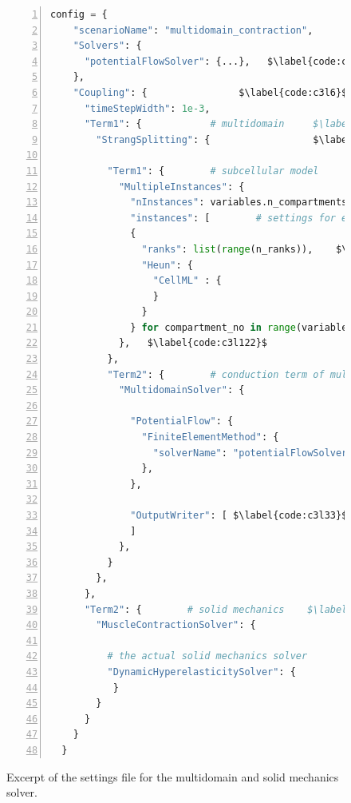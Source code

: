 \begin{figure}
\centering
\begin{framed}
\begin{lstlisting}[basicstyle=\scriptsize\ttfamily,language=Python,commentstyle=\color{gray},numbers=left]
  config = {
    "scenarioName": "multidomain_contraction",
    "Solvers": {
      "potentialFlowSolver": {...},   $\label{code:c3l4}$
    },
    "Coupling": {                $\label{code:c3l6}$
      "timeStepWidth": 1e-3,
      "Term1": {            # multidomain     $\label{code:c3l8}$
        "StrangSplitting": {                  $\label{code:c3l9}$
          
          "Term1": {        # subcellular model      $\label{code:c3l11}$
            "MultipleInstances": {                    $\label{code:c3l12}$
              "nInstances": variables.n_compartments,    $\label{code:c3l13}$
              "instances": [        # settings for each motor unit     $\label{code:c3l14}$
              {
                "ranks": list(range(n_ranks)),    $\label{code:c3l16}$
                "Heun": {
                  "CellML" : {
                  }
                }
              } for compartment_no in range(variables.n_compartments)] $\label{code:c3l21}$
            },   $\label{code:c3l122}$
          }, 
          "Term2": {        # conduction term of multidomain      $\label{code:c3l24}$
            "MultidomainSolver": {
              
              "PotentialFlow": {                                   $\label{code:c3l27}$
                "FiniteElementMethod": {  
                  "solverName": "potentialFlowSolver",            $\label{code:c3l29}$
                },
              },                                                    $\label{code:c3l31}$
              
              "OutputWriter": [ $\label{code:c3l33}$
              ]
            },
          }
        },
      },
      "Term2": {        # solid mechanics    $\label{code:c3l39}$
        "MuscleContractionSolver": {
          
          # the actual solid mechanics solver
          "DynamicHyperelasticitySolver": {
           }
        }
      }
    }
  }
\end{lstlisting}
\end{framed}
\caption{Excerpt of the settings file for the multidomain and solid mechanics solver.}%
\label{fig:example_multidomain_settings}%
\end{figure}

